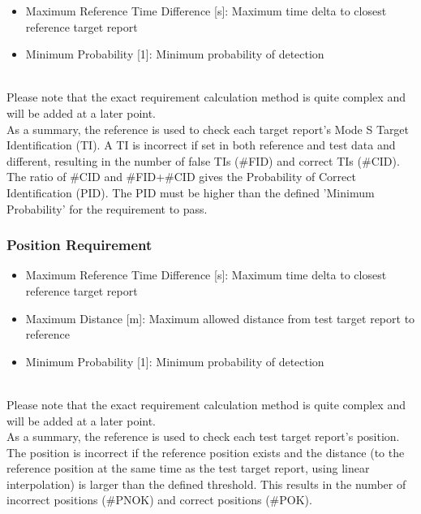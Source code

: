 \begin{itemize}  
\item Maximum Reference Time Difference [s]: Maximum time delta to closest reference target report
\item Minimum Probability [1]: Minimum probability of detection
\end{itemize}
\ \\

Please note that the exact requirement calculation method is quite complex and will be added at a later point. \\

As a summary, the reference is used to check each target report's Mode S Target Identification (TI). A TI is incorrect if set in both reference and test data and different, resulting in the number of false TIs (\#FID) and correct TIs (\#CID). \\

The ratio of \#CID and \#FID+\#CID gives the Probability of Correct Identification (PID). The PID must be higher than the defined 'Minimum Probability' for the requirement to pass.

\subsubsection{Position Requirement}

\begin{itemize}  
\item Maximum Reference Time Difference [s]: Maximum time delta to closest reference target report
\item Maximum Distance [m]: Maximum allowed distance from test target report to reference
\item Minimum Probability [1]: Minimum probability of detection
\end{itemize}
\ \\

Please note that the exact requirement calculation method is quite complex and will be added at a later point. \\

As a summary, the reference is used to check each test target report's position. The position is incorrect if the reference position exists and the distance (to the reference position at the same time as the test target report, using linear interpolation) is larger than the defined threshold. This results in the number of incorrect positions (\#PNOK) and correct positions (\#POK). \\


